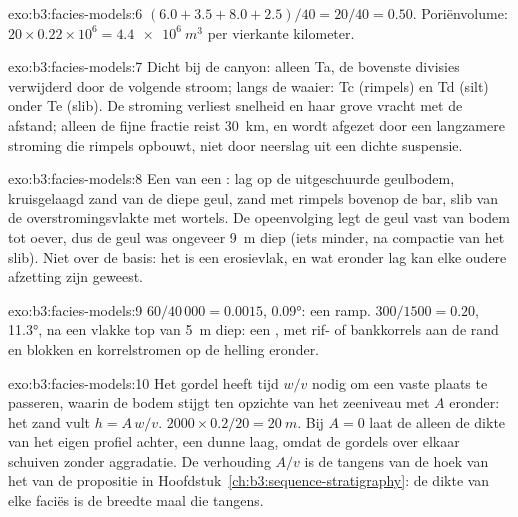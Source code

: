 \begin{solution}{exo:b3:facies-models:6}
$(6.0 + 3.5 + 8.0 + 2.5)/40 = 20/40 = 0.50$. Poriënvolume: $20\times0.22
\times10^6 = \qty{4.4e6}{m^3}$ per vierkante kilometer.
\end{solution}

\begin{solution}{exo:b3:facies-models:7}
Dicht bij de canyon: alleen Ta, de bovenste divisies verwijderd door de volgende stroom;
langs de waaier: Tc (rimpels) en Td (silt) onder Te (slib). De stroming verliest snelheid
en haar grove vracht met de afstand; alleen de fijne fractie reist
\qty{30}{km}, en wordt afgezet door een langzamere stroming die rimpels opbouwt, niet
door neerslag uit een dichte suspensie.
\end{solution}

\begin{solution}{exo:b3:facies-models:8}
Een  van een : lag op de uitgeschuurde geulbodem,
kruisgelaagd zand van de diepe geul, zand met rimpels bovenop de bar,
slib van de overstromingsvlakte met wortels. De opeenvolging legt de geul vast van bodem tot
oever, dus de geul was ongeveer \qty{9}{m} diep (iets minder, na
compactie van het slib). Niet over de basis: het is een erosievlak, en
wat eronder lag kan elke oudere afzetting zijn geweest.
\end{solution}

\begin{solution}{exo:b3:facies-models:9}
$60/40\,000 = 0.0015$, \ang{0.09}: een ramp. $300/1500 = 0.20$, \ang{11.3},
na een vlakke top van \qty{5}{m} diep: een , met rif- of bankkorrels
aan de rand en blokken en korrelstromen op de helling eronder.
\end{solution}

\begin{solution}{exo:b3:facies-models:10}
Het gordel heeft tijd $w/v$ nodig om een vaste plaats te passeren, waarin de bodem
stijgt ten opzichte van het zeeniveau met $A$ eronder: het zand vult $h = A\,w/v$.
$2000\times0.2/20 = \qty{20}{m}$. Bij $A = 0$ laat de  alleen
de dikte van het eigen profiel achter, een dunne laag, omdat de gordels over elkaar schuiven
zonder aggradatie. De verhouding $A/v$ is de tangens van de hoek van het
 van de propositie in Hoofdstuk~\ref{ch:b3:sequence-stratigraphy}: de
dikte van elke faciës is de breedte maal die tangens.
\end{solution}


